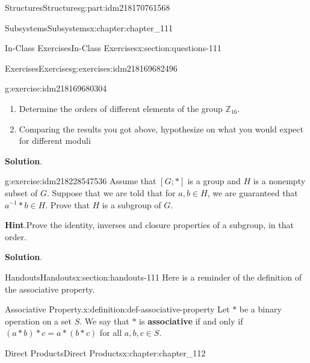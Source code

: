 \documentclass[oneside,10pt,]{book}
\newcommand{\blocktitlefont}{\relax}
\newcommand{\terminology}[1]{\textbf{#1}}
\numberwithin{equation}{section}
\begin{document}
\begin{partptx}{Structures}{}{Structures}{}{}{g:part:idm218170761568}
\begin{chapterptx}{Subsystems}{}{Subsystems}{}{}{x:chapter:chapter_111}
\begin{sectionptx}{In-Class Exercises}{}{In-Class Exercises}{}{}{x:section:questions-111}
\begin{exercises-subsection-numberless}{Exercises}{}{Exercises}{}{}{g:exercises:idm218169682496}
\begin{exercisegroup}
\begin{divisionexerciseeg}{3}{}{}{g:exercise:idm218169680304}
\begin{enumerate}[label=(\alph*)]
\item{}Determine the orders of different elements of the group \(\mathbb{Z}_{16}\).%
\item{}Comparing the results you got above, hypothesize on what you would expect for different moduli%
\end{enumerate}
%
\par\smallskip%
\noindent\textbf{\blocktitlefont Solution}.\hypertarget{g:solution:idm218228546640}{}\quad{}%
\end{divisionexerciseeg}%
\begin{divisionexerciseeg}{4}{}{}{g:exercise:idm218228547536}%
Assume that \([G;*]\) is a group and \(H\) is a nonempty subset of \(G\). Suppose that we are told that for \(a, b \in H\), we are guaranteed that \(a^{-1}*b \in H\).  Prove that \(H\) is a subgroup of \(G\).%
\par\smallskip%
\noindent\textbf{\blocktitlefont Hint}.\hypertarget{g:hint:idm218228586240}{}\quad{}Prove the identity, inverses and closure properties of a subgroup, in that order.%
\par\smallskip%
\noindent\textbf{\blocktitlefont Solution}.\hypertarget{g:solution:idm218228587840}{}\quad{}%
\end{divisionexerciseeg}%
\end{exercisegroup}
\par\medskip\noindent
\end{exercises-subsection-numberless}
\end{sectionptx}
%
%
\typeout{************************************************}
\typeout{************************************************}
%
\begin{sectionptx}{Handouts}{}{Handouts}{}{}{x:section:handouts-111}
Here is a reminder of the definition of the associative property.%
\begin{definition}{Associative Property.}{x:definition:def-associative-property}%
%
Let \(*\) be a binary operation on a set \(S\). We say that \(*\) is  \terminology{associative}  if and only if \((a * b) * c = a * (b * c)\) for all \(a, b, c \in  S\).%
\end{definition}
\end{sectionptx}
\end{chapterptx}
%
\typeout{************************************************}
\typeout{************************************************}
%
\begin{chapterptx}{Direct Products}{}{Direct Products}{}{}{x:chapter:chapter_112}

\end{chapterptx}
\end{partptx}
\end{document}
